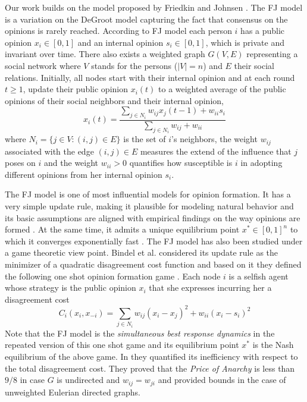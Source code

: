 Our work builds on the model proposed by Friedkin and Johnsen \cite{FJ90}. 
The FJ model is a variation on the DeGroot model capturing the
fact that consensus on the opinions is rarely reached.
According to FJ model each person $i$ has a public opinion $x_i \in [0,1]$
and an internal opinion $s_i\in [0,1]$, which is private and invariant
over time. There also exists a weighted graph $G(V,E)$ representing a social
network where $V$ stands for the persons ($|V|=n$) and $E$ their social
relations. Initially, all nodes start with their internal opinion and
at each round $t\geq1$, update their public opinion $x_i(t)$ to a weighted
average of the public opinions of their social neighbors and their internal opinion,
%
\begin{equation}\label{eq:FJ_model}
  x_i(t)= \frac{\sum_{j\in N_i}w_{ij}x_j(t-1) + w_{ii}s_i}{\sum_{j\in
      N_i}w_{ij}+w_{ii}}
\end{equation}
%
where $N_i =\{j \in V:(i,j) \in E\}$ is the set of $i$'s neighbors,
the weight $w_{ij}$ associated with the edge $(i,j) \in E$ measures the extend
of the influence that $j$ poses on $i$ and the weight $w_{ii}>0$ quantifies how susceptible
is $i$ in adopting different opinions from her internal opinion $s_i$.

The FJ model is one of most influential models for opinion formation. It has
a very simple update rule, making it plausible for modeling natural behavior
and its basic assumptions are aligned with empirical findings on the way
opinions are formed \cite{AFH05,K47}.  At the same time, it admits a unique
equilibrium point $x^* \in [0,1]^n$ to which it converges exponentially fast
\cite{GS14}.  The FJ model has also been studied under a game theoretic view
point.  Bindel et al. considered its update rule as the minimizer of a
quadratic disagreement cost function and based on it they defined the following
one shot opinion formation game \cite{BKO11}. Each node $i$ is a selfish agent
whose strategy is the public opinion $x_i$ that she expresses incurring her a
disagreement cost
%
\begin{equation}\label{eq:BKO_cost}
  C_i(x_i,x_{-i})= \sum_{j \in N_i}w_{ij} (x_i-x_j)^2 + w_{ii}(x_i-s_i)^2
\end{equation}
%
Note that the FJ model is the \emph{simultaneous best response dynamics} in the
repeated version of this one shot game and its equilibrium point $x^*$ is the
Nash equilibrium of the above game. 
In \cite{BKO11} they quantified its inefficiency with respect to the 
total disagreement cost. They proved that the \emph{Price of Anarchy} is less 
than $9/8$ in case $G$ is undirected and $w_{ij}=w_{ji}$ and
provided bounds in the case of unweighted Eulerian directed graphs.

